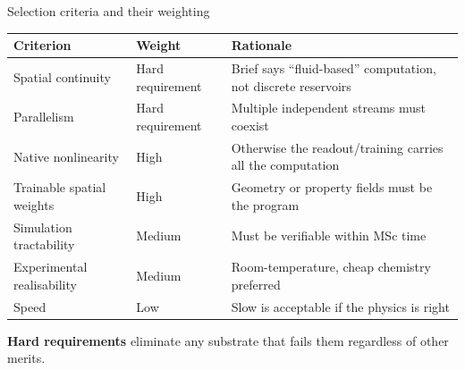 \documentclass[aspectratio=169,11pt]{beamer}
\begin{document}
\begin{frame}{Selection criteria and their weighting}

\begin{table}
\centering
\footnotesize
\begin{tabular}{p{4.0cm}p{2.0cm}p{7.0cm}}
\toprule
\textbf{Criterion} & \textbf{Weight} & \textbf{Rationale} \\
\midrule
Spatial continuity & Hard requirement & Brief says ``fluid-based'' computation, not discrete reservoirs \\
Parallelism & Hard requirement & Multiple independent streams must coexist \\
Native nonlinearity & High & Otherwise the readout/training carries all the computation \\
Trainable spatial weights & High & Geometry or property fields must be the program \\
Simulation tractability & Medium & Must be verifiable within MSc time \\
Experimental realisability & Medium & Room-temperature, cheap chemistry preferred \\
Speed & Low & Slow is acceptable if the physics is right \\
\bottomrule
\end{tabular}
\end{table}

\vspace{0.2cm}
\textbf{Hard requirements} eliminate any substrate that fails them regardless of other merits.

\end{frame}
\end{document}
